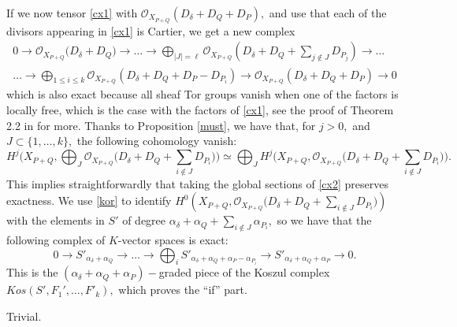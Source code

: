 \documentclass[a4paper,11pt]{amsart}
\newcommand{\cO}{{\mathcal O}}
\numberwithin{thm}{section}
\numberwithin{equation}{section}
\theoremstyle{definition}
\theoremstyle{plain}
\begin{document}
If we now tensor \eqref{cx1} with  $\cO_{X_{P+Q}}(D_\delta+D_Q+D_P),$ and use that  each of the divisors appearing in \eqref{cx1} is Cartier, we get a new complex
\begin{equation}\label{cx2}
\begin{array}{r}
0\to\cO_{X_{P+Q}}\big(D_\delta+D_Q\big)\to   \ldots \to\bigoplus_{|J|=\ell} \cO_{X_{P+Q}}(D_\delta+D_Q+\sum_{j\notin J}D_{P_j})\to\ldots
\\[2mm]
\ldots \to\bigoplus_{1\le i \le k} \cO_{X_{P+Q}}(D_\delta+D_Q+D_P-D_{P_i})\to\cO_{X_{P+Q}}(D_\delta+D_Q+D_P)\to0
\end{array}
\end{equation}
which is also exact because all sheaf Tor groups vanish when one of the factors is locally free, which is the case with the factors of \eqref{cx1}, see the proof of Theorem 2.2 in \cite{CD05} for more. Thanks to Proposition \ref{must}, we have that, for $j>0,$
 and $J\subset\{1,\ldots, k\},$ the following cohomology vanish:
$$H^j \Big(X_{P+Q},\bigoplus_{J}\cO_{X_{P+Q}}\big(D_\delta+D_Q+\sum_{i\notin J} D_{P_i}\big)\Big)\simeq
\bigoplus_{J} H^j \Big(X_{P+Q},\cO_{X_{P+Q}}\big(D_\delta+D_Q+\sum_{i\notin J} D_{P_i}\big)
\Big).
$$
This implies straightforwardly that taking the global sections of \eqref{cx2} preserves exactness. We use \eqref{kor} to identify
$H^0 \left(X_{P+Q},\cO_{X_{P+Q}}\big(D_\delta+D_Q+\sum_{i\notin J} D_{P_i}\big)\right)$ with the elements in $S'$ of degree $\alpha_\delta+\alpha_Q+\sum_{i\notin J}\alpha_{P_i},$ so we have that the following complex of $K$-vector spaces is exact:
\begin{equation}\label{cx3}
0\to S'_{\alpha_\delta+\alpha_Q}\to \ldots \to\bigoplus_i  S'_{\alpha_\delta+\alpha_Q+\alpha_P-\alpha_{P_i}}\to S'_{\alpha_\delta+\alpha_Q+\alpha_P}\to0.
\end{equation}
This is the $(\alpha_\delta+\alpha_Q+\alpha_P)-$graded piece of the Koszul complex  $Kos(S',F_1',\ldots, F'_k),$ which proves the ``if'' part.


 Trivial.
\end{document}
